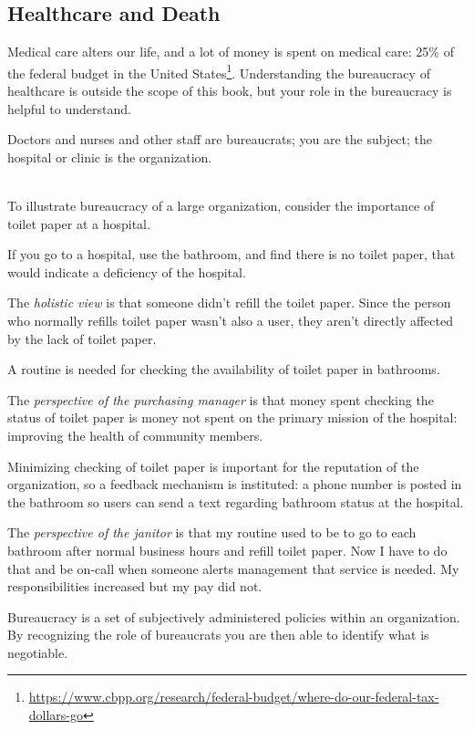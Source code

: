 \subsection*{Healthcare and Death\label{sec:bureaucracy-of-death}}
Medical care alters our life, and a lot of money is spent on medical care: 25\% of the federal budget in the United States\footnote{\href{https://www.cbpp.org/research/federal-budget/where-do-our-federal-tax-dollars-go}{https://www.cbpp.org/research/federal-budget/where-do-our-federal-tax-dollars-go}}. Understanding the bureaucracy of healthcare is outside the scope of this book, but your role in the bureaucracy is helpful to understand.

Doctors and nurses and other staff are bureaucrats; you are the subject; the hospital or clinic is the organization. 

\ \\
To illustrate bureaucracy of a large organization, consider the importance of toilet paper at a hospital. 
\begin{mdframed}
If you go to a hospital, use the bathroom, and find there is no toilet paper, that would indicate a deficiency of the hospital.

The \textit{holistic view} is that someone didn't refill the toilet paper. Since the person who normally refills toilet paper wasn't also a user, they aren't directly affected by the lack of toilet paper.

A routine is needed for checking the availability of toilet paper in bathrooms. 

The \textit{perspective of the purchasing manager} is that money spent checking the status of toilet paper is money not spent on the primary mission of the hospital: improving the health of community members.

Minimizing checking of toilet paper is important for the reputation of the organization, so a feedback mechanism is instituted: a phone number is posted in the bathroom so users can send a text regarding bathroom status at the hospital.

The \textit{perspective of the janitor} is that my routine used to be to go to each bathroom after normal business hours and refill toilet paper. Now I have to do that and be on-call when someone alerts management that service is needed. My responsibilities increased but my pay did not.

\end{mdframed}






Bureaucracy is a set of subjectively administered policies within an organization. By recognizing the role of bureaucrats you are then able to identify what is negotiable. 
